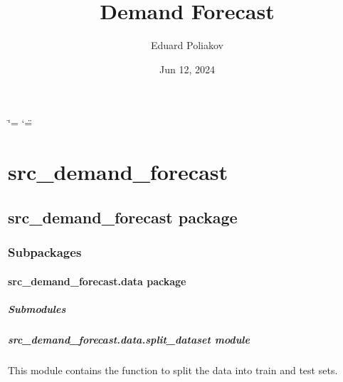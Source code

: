 \documentclass[letterpaper,10pt,english]{sphinxmanual}
\title{Demand Forecast}
\date{Jun 12, 2024}
\author{Eduard Poliakov}
\begin{document}
\ifdefined\shorthandoff
  \ifnum\catcode`\=\string=\active\shorthandoff{=}\fi
  \ifnum\catcode`\"=\active{}\fi
\fi

\pagestyle{empty}
\sphinxmaketitle
\pagestyle{plain}
\sphinxtableofcontents
\pagestyle{normal}
\label{\detokenize{index::doc}}


\sphinxstepscope


\chapter{src\_demand\_forecast}
\label{\detokenize{modules:src-demand-forecast}}\label{\detokenize{modules::doc}}
\sphinxstepscope


\section{src\_demand\_forecast package}
\label{\detokenize{src_demand_forecast:src-demand-forecast-package}}\label{\detokenize{src_demand_forecast::doc}}

\subsection{Subpackages}
\label{\detokenize{src_demand_forecast:subpackages}}
\sphinxstepscope


\subsubsection{src\_demand\_forecast.data package}
\label{\detokenize{src_demand_forecast.data:src-demand-forecast-data-package}}\label{\detokenize{src_demand_forecast.data::doc}}

\paragraph{Submodules}
\label{\detokenize{src_demand_forecast.data:submodules}}

\paragraph{src\_demand\_forecast.data.split\_dataset module}
\label{\detokenize{src_demand_forecast.data:module-src_demand_forecast.data.split_dataset}}\label{\detokenize{src_demand_forecast.data:src-demand-forecast-data-split-dataset-module}}
\sphinxAtStartPar
This module contains the function to split the data into train and test sets.
\end{document}
